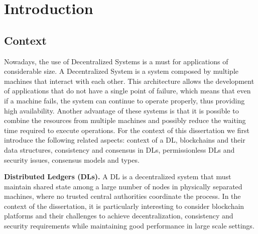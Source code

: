 
%

\chapter{Introduction}
\label{cha:introduction}


%
%
%

\section{Context} 
\label{sub:intro-context}

Nowadays, the use of Decentralized Systems is a must for applications of considerable size. A Decentralized System is a system composed by multiple machines that interact with each other. This architecture allows the development of applications that do not have a single point of failure, which means that even if a machine fails, the system can continue to operate properly, thus providing high availability. Another advantage of these systems is that it is possible to combine the resources from multiple machines and possibly reduce the waiting time required to execute operations. For the context of this dissertation we first introduce the following related aspects: context of a DL, blockchains and their data structures, consistency and consensus in DLs, permissionless DLs and security issues, consensus models and types.

\textbf{Distributed Ledgers (DLs).} A \gls{DL} is a decentralized system that must maintain shared state among a large number of nodes in physically separated machines, where no trusted central authorities coordinate the process. In the context of the dissertation, it is particularly interesting to consider blockchain platforms and their challenges to achieve decentralization, consistency and security requirements while maintaining good performance in large scale settings.


